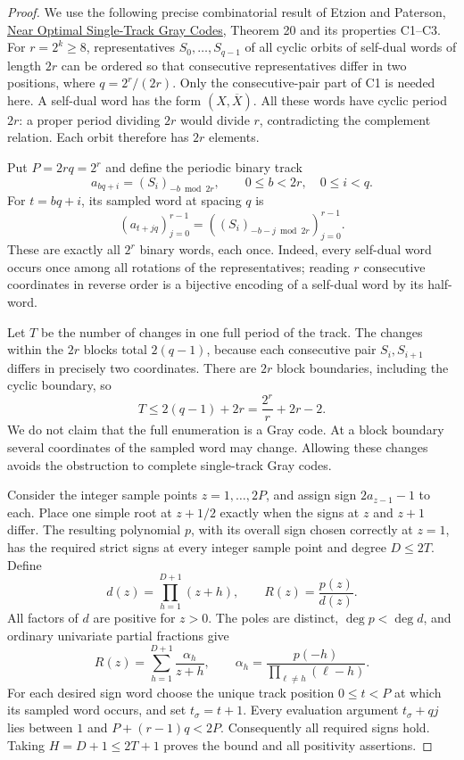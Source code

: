 \documentclass[11pt]{article}
\begin{document}
\begin{proof}
We use the following precise combinatorial result of Etzion and Paterson,
\href{https://etzion.net.technion.ac.il/files/2016/02/P36.pdf}
{Near Optimal Single-Track Gray Codes}, Theorem 20 and its properties
C1--C3. For $r=2^k\geq8$, representatives
$S_0,\ldots,S_{q-1}$ of all cyclic orbits of self-dual words of length
$2r$ can be ordered so that consecutive representatives differ in two
positions, where $q=2^r/(2r)$. Only the consecutive-pair part of C1
is needed here. A self-dual word has the form $(X,\overline X)$.
All these words have cyclic period $2r$: a proper period dividing $2r$
would divide $r$, contradicting the complement relation. Each orbit
therefore has $2r$ elements.

Put $P=2rq=2^r$ and define the periodic binary track
\[
 a_{bq+i}=(S_i)_{-b\bmod 2r},
 \qquad 0\leq b<2r,\quad0\leq i<q.
\]
For $t=bq+i$, its sampled word at spacing $q$ is
\[
 (a_{t+jq})_{j=0}^{r-1}
   =((S_i)_{-b-j\bmod2r})_{j=0}^{r-1}.
\]
These are exactly all $2^r$ binary words, each once. Indeed, every
self-dual word occurs once among all rotations of the representatives;
reading $r$ consecutive coordinates in reverse order is a bijective
encoding of a self-dual word by its half-word.

Let $T$ be the number of changes in one full period of the track.
The changes within the $2r$ blocks total $2(q-1)$, because each
consecutive pair $S_i,S_{i+1}$ differs in precisely two coordinates.
There are $2r$ block boundaries, including the cyclic boundary, so
\[
 T\leq2(q-1)+2r=\frac{2^r}r+2r-2.
\]
We do not claim that the full enumeration is a Gray code. At a block
boundary several coordinates of the sampled word may change. Allowing
these changes avoids the obstruction to complete single-track Gray codes.

Consider the integer sample points $z=1,\ldots,2P$, and assign sign
$2a_{z-1}-1$ to each. Place one simple root at $z+1/2$ exactly when
the signs at $z$ and $z+1$ differ. The resulting polynomial $p$, with
its overall sign chosen correctly at $z=1$, has the required strict
signs at every integer sample point and degree $D\leq2T$. Define
\[
 d(z)=\prod_{h=1}^{D+1}(z+h),
 \qquad R(z)=\frac{p(z)}{d(z)}.
\]
All factors of $d$ are positive for $z>0$. The poles are distinct,
$\deg p<\deg d$, and ordinary univariate partial fractions give
\[
 R(z)=\sum_{h=1}^{D+1}\frac{\alpha_h}{z+h},
 \qquad
 \alpha_h=\frac{p(-h)}{\prod_{\ell\neq h}(\ell-h)}.
\]
For each desired sign word choose the unique track position
$0\leq t<P$ at which its sampled word occurs, and set $t_\sigma=t+1$.
Every evaluation argument $t_\sigma+qj$ lies between $1$ and
$P+(r-1)q<2P$. Consequently all required signs hold. Taking
$H=D+1\leq2T+1$ proves the bound and all positivity assertions.
\end{proof}
\end{document}

